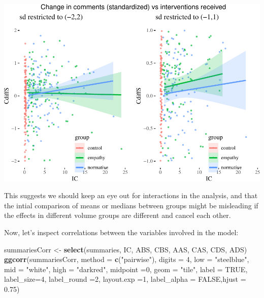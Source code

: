 \documentclass[10pt,dvipsnames,enabledeprecatedfontcommands]{scrartcl}
\newenvironment{Shaded}{\begin{snugshade}}{\end{snugshade}}
\newcommand{\DataTypeTok}[1]{\textcolor[rgb]{0.13,0.29,0.53}{#1}}
\newcommand{\DecValTok}[1]{\textcolor[rgb]{0.00,0.00,0.81}{#1}}
\newcommand{\FloatTok}[1]{\textcolor[rgb]{0.00,0.00,0.81}{#1}}
\newcommand{\KeywordTok}[1]{\textcolor[rgb]{0.13,0.29,0.53}{\textbf{#1}}}
\newcommand{\NormalTok}[1]{#1}
\newcommand{\OtherTok}[1]{\textcolor[rgb]{0.56,0.35,0.01}{#1}}
\newcommand{\StringTok}[1]{\textcolor[rgb]{0.31,0.60,0.02}{#1}}
\begin{document}
\begin{center}\includegraphics[width=1\linewidth]{bayesianReport_files/figure-latex/icc-1} \end{center}
\normalsize

This suggests we should keep an eye out for interactions in the
analysis, and that the intial comparison of means or medians between
groups might be misleading if the effects in different volume groups are
different and cancel each other.

Now, let's inspect correlations between the variables involved in the
model:

\vspace{1mm}
\footnotesize

\begin{Shaded}
\begin{Highlighting}[]
\NormalTok{summariesCorr <-}\StringTok{ }\KeywordTok{select}\NormalTok{(summaries, IC, ABS, CBS, AAS, CAS, CDS, ADS)}
\KeywordTok{ggcorr}\NormalTok{(summariesCorr, }\DataTypeTok{method =} \KeywordTok{c}\NormalTok{(}\StringTok{"pairwise"}\NormalTok{),}
       \DataTypeTok{digits =} \DecValTok{4}\NormalTok{, }\DataTypeTok{low =} \StringTok{"steelblue"}\NormalTok{, }\DataTypeTok{mid =} \StringTok{"white"}\NormalTok{,}
       \DataTypeTok{high =} \StringTok{"darkred"}\NormalTok{, }\DataTypeTok{midpoint =}\DecValTok{0}\NormalTok{,}
       \DataTypeTok{geom =} \StringTok{"tile"}\NormalTok{, }\DataTypeTok{label =} \OtherTok{TRUE}\NormalTok{, }\DataTypeTok{label_size=}\DecValTok{4}\NormalTok{, }\DataTypeTok{label_round =}\DecValTok{2}\NormalTok{, }\DataTypeTok{layout.exp =}\DecValTok{1}\NormalTok{,}
       \DataTypeTok{label_alpha =} \OtherTok{FALSE}\NormalTok{,}\DataTypeTok{hjust =} \FloatTok{0.75}\NormalTok{)}
\end{Highlighting}
\end{Shaded}
\end{document}

